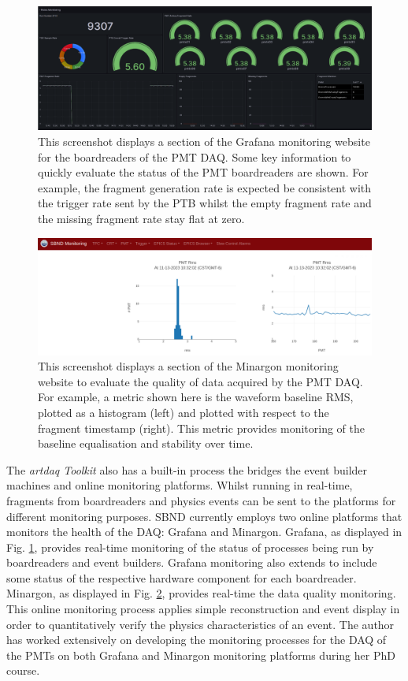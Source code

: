 \begin{figure}[htbp!] 
\centering    
\includegraphics[width=1.0\textwidth]{Grafana}
\caption[Grafana]{
This screenshot displays a section of the Grafana monitoring website for the boardreaders of the PMT DAQ.
Some key information to quickly evaluate the status of the PMT boardreaders are shown.
For example, the fragment generation rate is expected be consistent with the trigger rate sent by the PTB whilst the empty fragment rate and the missing fragment rate stay flat at zero.
}
\label{fig:Grafana}
 \end{figure}

\begin{figure}[htbp!] 
\centering    
\includegraphics[width=1.0\textwidth]{Minargon}
\caption[Minargon]{
This screenshot displays a section of the Minargon monitoring website to evaluate the quality of data acquired by the PMT DAQ.
For example, a metric shown here is the waveform baseline RMS, plotted as a histogram (left) and plotted with respect to the fragment timestamp (right).
This metric provides monitoring of the baseline equalisation and stability over time.
}
\label{fig:Minargon}
\end{figure}

The \textit{artdaq Toolkit} also has a built-in process the bridges the event builder machines and online monitoring platforms.
Whilst running in real-time, fragments from boardreaders and physics events can be sent to the platforms for different monitoring purposes.
SBND currently employs two online platforms that monitors the health of the DAQ: Grafana and Minargon.
Grafana, as displayed in Fig. \ref{fig:Grafana}, provides real-time monitoring of the status of processes being run by boardreaders and event builders. 
Grafana monitoring also extends to include some status of the respective hardware component for each boardreader.
Minargon, as displayed in Fig. \ref{fig:Minargon}, provides real-time the data quality monitoring. 
This online monitoring process applies simple reconstruction and event display in order to quantitatively verify the physics characteristics of an event. 
The author has worked extensively on developing the monitoring processes for the DAQ of the PMTs on both Grafana and Minargon monitoring platforms during her PhD course. 

